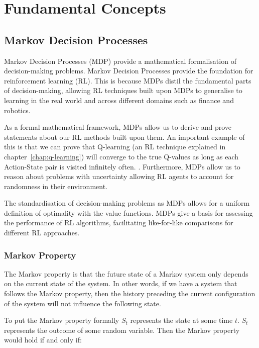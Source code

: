 \documentclass[]{final_report}
\begin{document}

\chapter{Fundamental Concepts}
\section{Markov Decision Processes}

Markov Decision Processes (MDP) provide a mathematical formalisation of decision-making problems. Markov Decision Processes provide the foundation for reinforcement learning (RL). This is because MDPs distil the fundamental parts of decision-making, allowing RL techniques built upon MDPs to generalise to learning in the real world and across different domains such as finance and robotics. 

As a formal mathematical framework, MDPs allow us to derive and prove statements about our RL methods built upon them. An important example of this is that we can prove that Q-learning (an RL technique explained in chapter~\ref{chap:q-learning}) will converge to the true Q-values as long as each Action-State pair is visited infinitely often. \cite{watkins1992q}. Furthermore, MDPs allow us to reason about problems with uncertainty allowing RL agents to account for randomness in their environment. 

The standardisation of decision-making problems as MDPs allows for a uniform definition of optimality with the value functions. MDPs give a basis for assessing the performance of RL algorithms, facilitating like-for-like comparisons for different RL approaches. 


\subsection{Markov Property}

The Markov property is that the future state of a Markov system only depends on the current state of the system. In other words, if we have a system that follows the Markov property, then the history preceding the current configuration of the system will not influence the following state.

To put the Markov property formally $S_t$ represents the state at some time $t$. $S_t$ represents the outcome of some random variable. Then the Markov property would hold if and only if:
\end{document}
